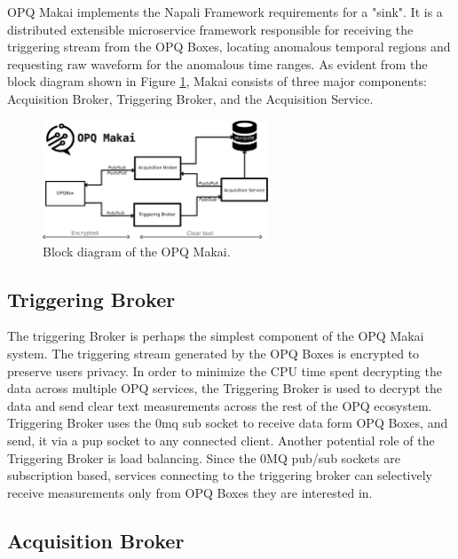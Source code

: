 OPQ Makai implements the Napali Framework requirements for a "sink".  It is a distributed extensible microservice framework responsible for receiving the triggering stream from the OPQ Boxes, locating anomalous temporal regions and requesting raw waveform for the anomalous time ranges. As evident from the block diagram shown in Figure \ref{fig:7}, Makai consists of three major components: Acquisition Broker, Triggering Broker, and the Acquisition Service. 
\begin{figure}[h]
  \begin{center}
  \includegraphics[width=0.6\textwidth]{img/makai_main.pdf}
  \end{center}
  \caption{Block diagram of the OPQ Makai.}
  \label{fig:7}
\end{figure}

\subsection{Triggering Broker}

The triggering Broker is perhaps the simplest component of the OPQ Makai system. The triggering stream generated by the OPQ Boxes is encrypted to preserve users privacy. In order to minimize the CPU time spent decrypting the data across multiple OPQ services, the Triggering Broker is used to decrypt the data and send clear text measurements across the rest of the OPQ ecosystem. Triggering Broker uses the 0mq sub socket to receive data form OPQ Boxes, and send, it via a pup socket to any connected client. Another potential role of the Triggering Broker is load balancing. Since the 0MQ pub/sub sockets are subscription based, services connecting to the triggering broker can selectively receive measurements only from OPQ Boxes they are interested in. 

\subsection{Acquisition Broker}

